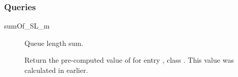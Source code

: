 \subsubsection{Queries}

\begin{description}

\item[sumOf\_SL\_m] \texonly{---} Queue length sum.\\

Return the pre-computed value of  for entry , class
.  This value was calculated in
 earlier.

\end{description}

